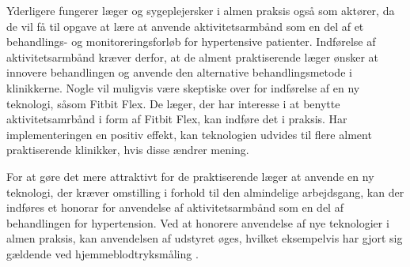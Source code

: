Yderligere fungerer læger og sygeplejersker i almen praksis også som aktører, da de vil få til opgave at lære at anvende aktivitetsarmbånd som en del af et behandlings- og monitoreringsforløb for hypertensive patienter. 
Indførelse af aktivitetsarmbånd kræver derfor, at de alment praktiserende læger ønsker at innovere behandlingen og anvende den alternative behandlingsmetode i klinikkerne. Nogle vil muligvis være skeptiske over for indførelse af en ny teknologi, såsom Fitbit Flex. De læger, der har interesse i at benytte aktivitetsamrbånd i form af Fitbit Flex, kan indføre det i praksis. Har implementeringen en positiv effekt, kan teknologien udvides til flere alment praktiserende klinikker, hvis disse ændrer mening.

For at gøre det mere attraktivt for de praktiserende læger at anvende en ny teknologi, der kræver omstilling i forhold til den almindelige arbejdsgang, kan der indføres et honorar for anvendelse af aktivitetsarmbånd som en del af behandlingen for hypertension. Ved at honorere anvendelse af nye teknologier i almen praksis, kan anvendelsen af udstyret øges, hvilket eksempelvis har gjort sig gældende ved hjemmeblodtryksmåling \citep{bang2006}.